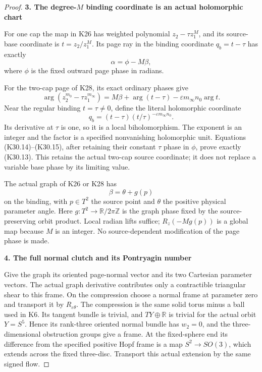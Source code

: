 \begin{proof}
\par

\medskip\noindent\textbf{3. The degree-\(M\) binding coordinate is an actual holomorphic chart}

\par\nobreak

For one cap the map in K26 has weighted polynomial
\(z_2-\tau z_1^M\), and its source-base coordinate is
\(t=z_2/z_1^M\). Its page ray in the binding coordinate
\(q_b=t-\tau\) has exactly
\[
                            \alpha=\phi-M\beta,
 \tag{K30.13}
\]
where \(\phi\) is the fixed outward page phase in radians.

For the two-cap page of K28, its exact ordinary phases give
\[
 \arg(z_2^{m_0}-\tau z_1^{m_\infty})
       =M\beta+\arg(t-\tau)-\varepsilon m_\infty n_0\arg t .
 \tag{K30.14}
\]
Near the regular binding \(t=\tau\ne0\), define the literal
holomorphic coordinate
\[
              q_b=(t-\tau)(t/\tau)^{-\varepsilon m_\infty n_0}.
 \tag{K30.15}
\]
Its derivative at \(\tau\) is one, so it is a local
biholomorphism. The exponent is an integer and the factor is
a specified nonvanishing holomorphic unit. Equations
(K30.14)--(K30.15), after retaining their constant \(\tau\)
phase in \(\phi\), prove exactly (K30.13).
This retains the actual two-cap source coordinate; it does
not replace a variable base phase by its limiting value.

The actual graph of K26 or K28 has
\[
                         \beta=\theta+g(p)
 \tag{K30.16}
\]
on the binding, with \(p\in T^2\) the source point and
\(\theta\) the positive physical parameter angle.
Here \(g:T^2\to\mathbb R/2\pi\mathbb Z\) is the graph phase
fixed by the source-preserving orbit product. Local radian
lifts suffice; \(R_z(-Mg(p))\) is a global map because \(M\)
is an integer. No source-dependent modification of the
page phase is made.

\par

\medskip\noindent\textbf{4. The full normal clutch and its Pontryagin number}

\par\nobreak

Give the graph its oriented page-normal vector and its two
Cartesian parameter vectors. The actual graph derivative
contributes only a contractible triangular shear to this
frame. On the compression choose a normal frame at parameter
zero and transport it by \(R_{\varepsilon\theta}\).
The compression is the same solid torus minus a ball used
in K6. Its tangent bundle is trivial, and
\(TY\oplus\mathbb R\) is trivial for the actual orbit
\(Y=S^5\). Hence its rank-three oriented normal bundle has
\(w_2=0\), and the three-dimensional obstruction groups
give a frame. At the fixed-sphere end its difference from
the specified positive Hopf frame is a map
\(S^2\to SO(3)\), which extends across the fixed three-disc.
Transport this actual extension by the same signed flow.


\end{proof}
